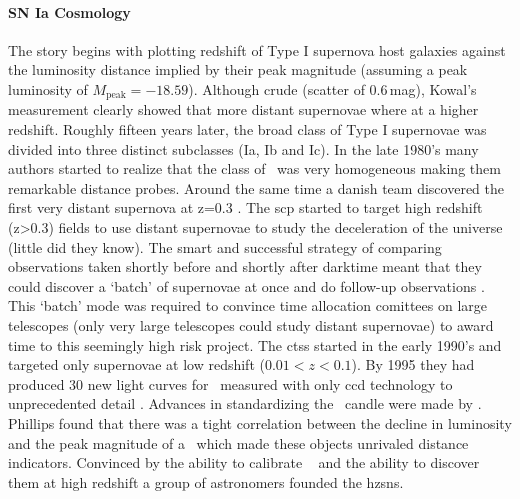 \paragraph{SN Ia Cosmology}
The story begins with \citet{1968AJ.....73.1021K} plotting redshift of Type I supernova host galaxies against the luminosity distance implied by their peak magnitude (assuming a peak luminosity of $M_\textrm{peak}=-18.59$). Although crude (scatter of 0.6\,mag), Kowal's measurement clearly showed that more distant supernovae where at a higher redshift. Roughly fifteen years later, the broad class of Type I supernovae was divided into three distinct subclasses (Ia, Ib and Ic). In the late 1980's many authors started to realize that the class of \sneia\ was very homogeneous \citep[][and references therein]{1992ARA&A..30..359B} making them remarkable  distance probes. Around the same time a danish team discovered the first very distant supernova at z=0.3 \citep{1989Natur.339..523N}. The \gls{scp} started to target high redshift (z>0.3) fields to use distant supernovae to study the deceleration of the universe (little did they know). The smart and successful strategy of comparing observations taken shortly before and shortly after darktime meant that they could discover a `batch' of supernovae at once and do follow-up observations  \citep{1995STIN...9629501P}. This `batch' mode was required to convince time allocation comittees on large telescopes (only very large telescopes could study distant supernovae) to award time to this seemingly high risk project. The \gls{ctss} started in the early 1990's and targeted only supernovae at low redshift ($0.01 < z < 0.1$). By 1995 they had produced 30 new light curves for \sneia\ measured with only \gls{ccd} technology to unprecedented detail \citep{1995AJ....109....1H}. Advances in standardizing the \snia\ candle were made by \citet{1993ApJ...413L.105P}. Phillips found that there was a tight correlation between the decline in luminosity and the peak magnitude of a \snia\ which made these objects unrivaled distance indicators. Convinced by the ability to calibrate \sneia\ \citep{1993ApJ...413L.105P} and the ability to discover them at high redshift  \citep{1995STIN...9629501P} a group of astronomers founded the \gls{hzsns}. 
